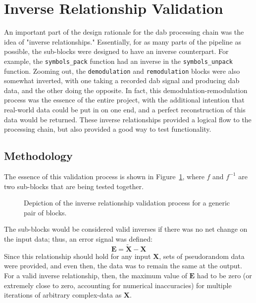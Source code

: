 \documentclass[class=report,11pt,crop=false]{standalone}
\begin{document}

\section{Inverse Relationship Validation}
An important part of the design rationale for the \gls{dab} processing chain was the idea of "inverse relationships." Essentially, for as many parts of the pipeline as possible, the sub-blocks were designed to have an inverse counterpart. For example, the \texttt{symbols\_pack} function had an inverse in the \texttt{symbols\_unpack} function. Zooming out, the \texttt{demodulation} and \texttt{remodulation} blocks were also somewhat inverted, with one taking a recorded \gls{dab} signal and producing \gls{dab} data, and the other doing the opposite. In fact, this demodulation-remodulation process was the essence of the entire project, with the additional intention that real-world data could be put in on one end, and a perfect reconstruction of this data would be returned. These inverse relationships provided a logical flow to the processing chain, but also provided a good way to test functionality.

\subsection{Methodology}
The essence of this validation process is shown in Figure~\ref{fig:inverse-overview}, where \(f\) and \(f^{-1}\) are two sub-blocks that are being tested together.

\begin{figure}[htbp]
  \centering
  \captionsetup{type=figure}
  \def\svgwidth{0.8\linewidth}
  { %
      }
  \caption{Depiction of the inverse relationship validation process for a generic pair of blocks.}
  \label{fig:inverse-overview}
\end{figure}

The sub-blocks would be considered valid inverses if there was no net change on the input data; thus, an error signal was defined:
\begin{equation}
  \mathbf{E} = \mathbf{\tilde{X}} - \mathbf{X}  
\end{equation}
Since this relationship should hold for any input \(\mathbf{X}\), sets of pseudorandom data were provided, and even then, the data was to remain the same at the output. For a valid inverse relationship, then, the maximum value of \(\mathbf{E}\) had to be zero (or extremely close to zero, accounting for numerical inaccuracies) for multiple iterations of arbitrary complex-data as \(\mathbf{X}\).
\end{document}
